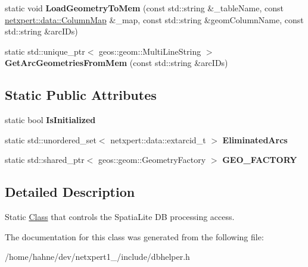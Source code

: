 \begin{DoxyCompactItemize}
\item 
static void {\bfseries Load\+Geometry\+To\+Mem} (const std\+::string \&\+\_\+table\+Name, const \hyperlink{structnetxpert_1_1data_1_1ColumnMap}{netxpert\+::data\+::\+Column\+Map} \&\+\_\+map, const std\+::string \&geom\+Column\+Name, const std\+::string \&arc\+I\+Ds)\hypertarget{classnetxpert_1_1io_1_1DBHELPER_a990cf25e6b12bd828e6221f5fcba8d73}{}\label{classnetxpert_1_1io_1_1DBHELPER_a990cf25e6b12bd828e6221f5fcba8d73}

\item 
static std\+::unique\+\_\+ptr$<$ geos\+::geom\+::\+Multi\+Line\+String $>$ {\bfseries Get\+Arc\+Geometries\+From\+Mem} (const std\+::string \&arc\+I\+Ds)\hypertarget{classnetxpert_1_1io_1_1DBHELPER_a785fdc3b270c78a1e5c5fbeda553182f}{}\label{classnetxpert_1_1io_1_1DBHELPER_a785fdc3b270c78a1e5c5fbeda553182f}

\end{DoxyCompactItemize}
\subsection*{Static Public Attributes}
\begin{DoxyCompactItemize}
\item 
static bool {\bfseries Is\+Initialized}\hypertarget{classnetxpert_1_1io_1_1DBHELPER_a7484e6b69665374f10a7b6e384dd9723}{}\label{classnetxpert_1_1io_1_1DBHELPER_a7484e6b69665374f10a7b6e384dd9723}

\item 
static std\+::unordered\+\_\+set$<$ netxpert\+::data\+::extarcid\+\_\+t $>$ {\bfseries Eliminated\+Arcs}\hypertarget{classnetxpert_1_1io_1_1DBHELPER_a1689cbaa3e6f7742b9c461fb5631a6b8}{}\label{classnetxpert_1_1io_1_1DBHELPER_a1689cbaa3e6f7742b9c461fb5631a6b8}

\item 
static std\+::shared\+\_\+ptr$<$ geos\+::geom\+::\+Geometry\+Factory $>$ {\bfseries G\+E\+O\+\_\+\+F\+A\+C\+T\+O\+RY}\hypertarget{classnetxpert_1_1io_1_1DBHELPER_a5bd8c8262a68576ac7d185539c23d6d0}{}\label{classnetxpert_1_1io_1_1DBHELPER_a5bd8c8262a68576ac7d185539c23d6d0}

\end{DoxyCompactItemize}


\subsection{Detailed Description}
Static \hyperlink{classClass}{Class} that controls the Spatia\+Lite DB processing access. 

The documentation for this class was generated from the following file\+:\begin{DoxyCompactItemize}
\item 
/home/hahne/dev/netxpert1\+\_/include/dbhelper.\+h\end{DoxyCompactItemize}
